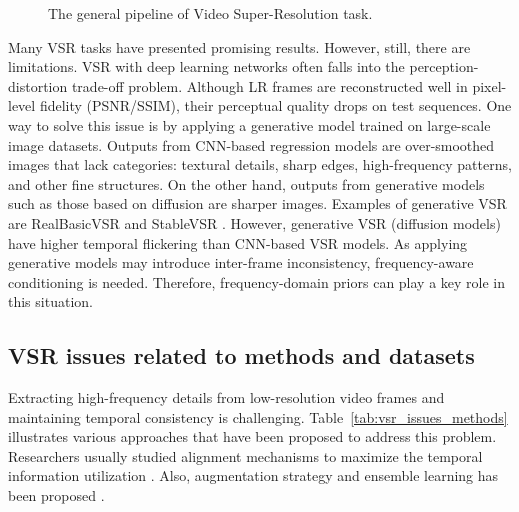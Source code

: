\begin{figure}[htbp] 
\centering
\caption{The general pipeline of Video Super-Resolution task.}
\label{fig:vsr_pipeline}
\end{figure}


Many VSR tasks have presented promising results. However, 
still, there are limitations. VSR with deep learning networks 
often falls into the perception-distortion trade-off problem. 
Although LR frames are reconstructed well in pixel-level 
fidelity (PSNR/SSIM), their perceptual quality drops on test 
sequences. One way to solve this issue is by applying a 
generative model trained on large-scale image datasets. 
Outputs from CNN-based regression models are over-smoothed 
images that lack categories: textural details, sharp edges, 
high-frequency patterns, and other fine structures. On the 
other hand, outputs from generative models such as those 
based on diffusion are sharper images. Examples of generative 
VSR are RealBasicVSR \cite{wang2021realbasicvsr} and StableVSR 
\cite{rota2024stablevsr}. However, generative VSR (diffusion 
models) have higher temporal flickering than CNN-based VSR 
models. As applying generative models may introduce 
inter-frame inconsistency, frequency-aware conditioning is 
needed. Therefore, frequency-domain priors can play a key 
role in this situation.


\subsection{VSR issues related to methods and datasets}

Extracting high-frequency details from low-resolution video 
frames and maintaining temporal consistency is challenging. 
Table~\ref{tab:vsr_issues_methods} illustrates various 
approaches that have been proposed to address this problem. 
Researchers usually studied alignment mechanisms to maximize 
the temporal information utilization \cite{chan2021basicvsr, 
chan2022basicvsrplusplus, wang2019edvr}. Also, augmentation 
strategy and ensemble learning has been proposed 
\cite{wang2021realbasicvsr, jo2018dup, isobe2020rsdn, 
liang2024vrt}.


